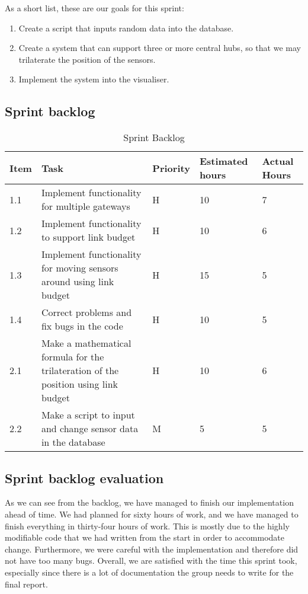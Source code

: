 \documentclass[../document]{subfiles}
\begin{document}
As a short list, these are our goals for this sprint:
\begin{enumerate}
	\item
	Create a script that inputs random data into the database.
	\item
	Create a system that can support three or more central hubs, so that we may trilaterate the position of the sensors.
	\item
	Implement the system into the visualiser.
\end{enumerate}

\subsection{Sprint backlog}

\begin{table}[H]
\caption{Sprint Backlog}
\centering
\begin{tabularx}{\textwidth}{|l|X|l|l|l|}
\hline
	Item
	&Task
	&Priority
	&Estimated hours
	&Actual Hours
	\\ \hline 1.1
	&Implement functionality for multiple gateways
	&H
	&10
	&7
	\\ \hline 1.2
	&Implement functionality to support link budget 
	&H
	&10
	&6
	\\ \hline 1.3
	&Implement functionality for moving sensors around using link budget
	&H
	&15
	&5
	\\ \hline 1.4
	&Correct problems and fix bugs in the code
	&H
	&10
	&5
	\\ \hline 2.1
	&Make a mathematical formula for the trilateration of the position using link budget
	&H
	&10
	&6
	\\ \hline 2.2
	&Make a script to input and change sensor data in the database
	&M
	&5
	&5
\\ \hline
\end{tabularx}
\end{table}

\subsection{Sprint backlog evaluation}

As we can see from the backlog, we have managed to finish our implementation ahead of time. We had planned for sixty hours of work, and we have managed to finish everything in thirty-four hours of work. This is mostly due to the highly modifiable code that we had written from the start in order to accommodate change. Furthermore, we were careful with the implementation and therefore did not have too many bugs. Overall, we are satisfied with the time this sprint took, especially since there is a lot of documentation the group needs to write for the final report.
\end{document}

